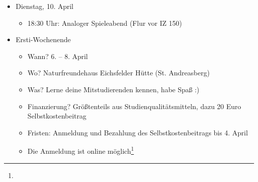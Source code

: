 \begin{itemize}
	\item Dienstag, 10. April
	\begin{itemize}
		\item 18:30 Uhr: Analoger Spieleabend (Flur vor IZ 150)
	\end{itemize}
	\item Ersti-Wochenende
	\begin{itemize}
		\item Wann? 6. – 8. April
		\item Wo? Naturfreundehaus Eichsfelder Hütte (St. Andreasberg)
		\item Was? Lerne deine Mitstudierenden kennen, habe Spaß :)
		\item Finanzierung? Größtenteils aus Studienqualitätsmitteln, dazu 20 Euro Selbstkostenbeitrag
		\item Fristen: Anmeldung und Bezahlung des Selbstkostenbeitrags bis 4. April
		\item Die Anmeldung ist online möglich\footnote{}
	\end{itemize}
\end{itemize}